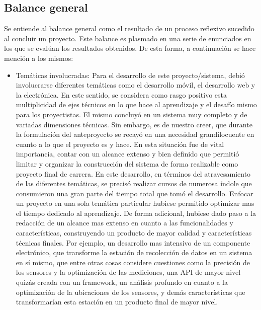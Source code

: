 \subsection{Balance general}

    \par Se entiende al balance general como el resultado de un proceso reflexivo sucedido al concluir un proyecto. Este balance es plasmado en una serie de enunciados en los que se evalúan los resultados obtenidos. De esta forma, a continuación se hace mención a los mismos:
    
    \begin{itemize}

        \item{Temáticas involucradas:} Para el desarrollo de este proyecto/sistema, debió involucrarse diferentes temáticas como el desarrollo móvil, el desarrollo web y la electrónica. En este sentido, se considera como rasgo positivo esta multiplicidad de ejes técnicos en lo que hace al aprendizaje y el desafío mismo para los proyectistas. El mismo concluyó en un sistema muy completo y de variadas dimensiones técnicas. Sin embargo, es de nuestro creer, que durante la formulación del anteproyecto se recayó en una necesidad grandilocuente en cuanto a lo que el proyecto es y hace. En esta situación fue de vital importancia, contar con un alcance extenso y bien definido que permitió limitar y organizar la construcción del sistema de forma realizable como proyecto final de carrera. En este desarrollo, en términos del atravesamiento de las diferentes temáticas, se precisó realizar cursos de numerosa índole que consumieron una gran parte del tiempo total que tomó el desarrollo. Enfocar un proyecto en una sola temática particular hubiese permitido optimizar mas el tiempo dedicado al aprendizaje. De forma adicional, hubiese dado paso a la redacción de un alcance mas extenso en cuanto a las funcionalidades y características, construyendo un producto de mayor calidad y características técnicas finales. Por ejemplo, un desarrollo mas intensivo de un componente electrónico, que transforme la estación de recolección de datos en un sistema en sí mismo, que entre otras cosas considere cuestiones como la precisión de los sensores y la optimización de las mediciones, una API de mayor nivel quizás creada con un framework, un análisis profundo en cuanto a la optimización de la ubicaciones de los sensores, y demás características que transformarían esta estación en un producto final de mayor nivel. 
        

\end{itemize}
